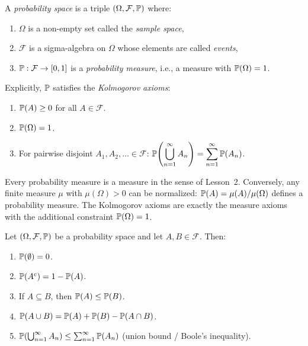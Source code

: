 \documentclass[11pt,a4paper]{article}
\begin{document}
\begin{definition}
\label{def:prob_space}
A \emph{probability space} is a triple $(\Omega, \mathcal{F}, \mathbb{P})$ where:
\begin{enumerate}[nosep]
  \item $\Omega$ is a non-empty set called the \emph{sample space},
  \item $\mathcal{F}$ is a sigma-algebra on $\Omega$ whose elements are
    called \emph{events},
  \item $\mathbb{P}: \mathcal{F} \to [0, 1]$ is a \emph{probability measure},
    i.e., a measure with $\mathbb{P}(\Omega) = 1$.
\end{enumerate}
Explicitly, $\mathbb{P}$ satisfies the \emph{Kolmogorov axioms}:
\begin{enumerate}[nosep,label=(K\arabic*)]
  \item $\mathbb{P}(A) \geq 0$ for all $A \in \mathcal{F}$.
  \item $\mathbb{P}(\Omega) = 1$.
  \item For pairwise disjoint $A_1, A_2, \ldots \in \mathcal{F}$:
    $\displaystyle\mathbb{P}\!\left(\bigcup_{n=1}^\infty A_n\right)
    = \sum_{n=1}^\infty \mathbb{P}(A_n)$.
\end{enumerate}
\end{definition}

\begin{remark}
Every probability measure is a measure in the sense of Lesson~2.
Conversely, any finite measure $\mu$ with $\mu(\Omega) > 0$ can be
normalized: $\mathbb{P}(A) = \mu(A)/\mu(\Omega)$ defines a probability measure.
The Kolmogorov axioms are exactly the measure axioms with the additional
constraint $\mathbb{P}(\Omega) = 1$.
\end{remark}

\begin{theorem}
\label{thm:prob_basic}
Let $(\Omega, \mathcal{F}, \mathbb{P})$ be a probability space and let
$A, B \in \mathcal{F}$. Then:
\begin{enumerate}[nosep,label=(\alph*)]
  \item $\mathbb{P}(\emptyset) = 0$.
  \item $\mathbb{P}(A^c) = 1 - \mathbb{P}(A)$.
  \item If $A \subseteq B$, then $\mathbb{P}(A) \leq \mathbb{P}(B)$.
  \item $\mathbb{P}(A \cup B) = \mathbb{P}(A) + \mathbb{P}(B) - \mathbb{P}(A \cap B)$.
  \item $\mathbb{P}\!\left(\bigcup_{n=1}^\infty A_n\right)
    \leq \sum_{n=1}^\infty \mathbb{P}(A_n)$ \quad (union bound / Boole's
    inequality).
\end{enumerate}
\end{theorem}
\end{document}
